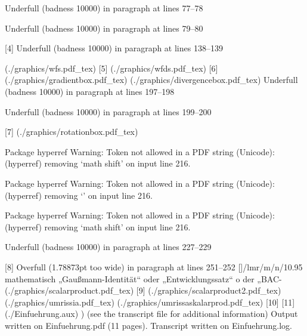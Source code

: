 Underfull \hbox (badness 10000) in paragraph at lines 77--78


Underfull \hbox (badness 10000) in paragraph at lines 79--80

[4]
Underfull \hbox (badness 10000) in paragraph at lines 138--139

(./graphics/wfs.pdf_tex) [5] (./graphics/wfds.pdf_tex) [6]
(./graphics/gradientbox.pdf_tex) (./graphics/divergencebox.pdf_tex)
Underfull \hbox (badness 10000) in paragraph at lines 197--198


Underfull \hbox (badness 10000) in paragraph at lines 199--200

[7] (./graphics/rotationbox.pdf_tex)

Package hyperref Warning: Token not allowed in a PDF string (Unicode):
(hyperref)                removing `math shift' on input line 216.


Package hyperref Warning: Token not allowed in a PDF string (Unicode):
(hyperref)                removing `\Delta' on input line 216.


Package hyperref Warning: Token not allowed in a PDF string (Unicode):
(hyperref)                removing `math shift' on input line 216.


Underfull \hbox (badness 10000) in paragraph at lines 227--229

[8]
Overfull \hbox (1.78873pt too wide) in paragraph at lines 251--252
[]\TU/lmr/m/n/10.95 mathematisch „Gaußmann-Identität“ oder „Entwicklungssatz“ o
der „BAC-
(./graphics/scalarproduct.pdf_tex) [9] (./graphics/scalarproduct2.pdf_tex)
(./graphics/umrissia.pdf_tex) (./graphics/umrissaskalarprod.pdf_tex) [10]
[11] (./Einfuehrung.aux) )
(see the transcript file for additional information)
Output written on Einfuehrung.pdf (11 pages).
Transcript written on Einfuehrung.log.
